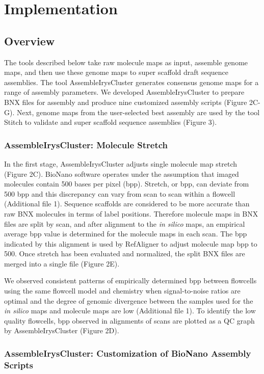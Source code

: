\documentclass{bmcart}
\begin{document}
\section*{Implementation}
\subsection*{Overview}

The tools described below take raw molecule maps as input, assemble genome maps, and then use these genome maps to super scaffold draft sequence assemblies. The tool AssembleIrysCluster generates consensus genome maps for a range of assembly parameters. We developed AssembleIrysCluster to prepare BNX files for assembly and produce nine customized assembly scripts (Figure 2C-G). Next, genome maps from the user-selected best assembly are used by the tool Stitch to validate and super scaffold sequence assemblies (Figure 3).

\subsubsection*{AssembleIrysCluster: Molecule Stretch}
In the first stage, AssembleIrysCluster adjusts single molecule map stretch (Figure 2C). BioNano software operates under the assumption that imaged molecules contain 500 bases per pixel (bpp). Stretch, or bpp, can deviate from 500 bpp and this discrepancy can vary from scan to scan within a flowcell (Additional file 1). Sequence scaffolds are considered to be more accurate than raw BNX molecules in terms of label positions. Therefore molecule maps in BNX files are split by scan, and after alignment to the \textit{in silico} maps, an empirical average bpp value is determined for the molecule maps in each scan. The bpp indicated by this alignment is used by RefAligner to adjust molecule map bpp to 500. Once stretch has been evaluated and normalized, the split BNX files are merged into a single file (Figure 2E).


We observed consistent patterns of empirically determined bpp between flowcells using the same flowcell model and chemistry when signal-to-noise ratios are optimal and the degree of genomic divergence between the samples used for the \textit{in silico} maps and molecule maps are low (Additional file 1). To identify the low quality flowcells, bpp observed in alignments of scans are plotted as a QC graph by AssembleIrysCluster (Figure 2D). 

\subsubsection*{AssembleIrysCluster: Customization of BioNano Assembly Scripts}
\end{document}
